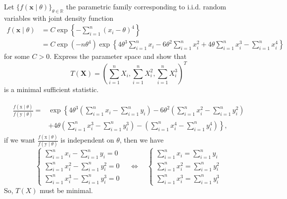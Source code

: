 \begin{exercise}
    Let \(\{f(\mathbf{x} \mid \theta)\}_{\theta \in \mathbb{R}}\) the parametric family corresponding to i.i.d. random variables with joint density function
    \[
        \begin{aligned}
            f(\mathbf{x} \mid \theta)&=C \exp \left\{-\sum_{i=1}^{n}\left(x_{i}-\theta\right)^{4}\right\}\\
            &=C \exp \left(-n \theta^{4}\right) \exp \left\{4 \theta^{3} \sum_{i=1}^{n} x_{i}-6 \theta^{2} \sum_{i=1}^{n} x_{i}^{2}+4 \theta \sum_{i=1}^{n} x_{i}^{3}-\sum_{i=1}^{n} x_{i}^{4}\right\}
        \end{aligned}
    \]
    for some \(C>0\). Express the parameter space and show that
    \[
        T(\mathbf{X})=\left(\sum_{i=1}^{n} X_{i}, \sum_{i=1}^{n} X_{i}^{2}, \sum_{i=1}^{n} X_{i}^{3}\right)^T
    \]
    is a minimal sufficient statistic. 
\end{exercise}

\begin{solution}
    \begin{align}
        \begin{aligned}
        \frac{f(\mathrm{x} \mid \theta)}{f(\mathrm{y} \mid \theta)}=& \exp \left\{4 \theta^{3}\left(\sum_{i=1}^{n} x_{i}-\sum_{i=1}^{n} y_{i}\right)-6 \theta^{2}\left(\sum_{i=1}^{n} x_{i}^{2}-\sum_{i=1}^{n} y_{i}^{2}\right)\right.\\
        &\left.+4 \theta\left(\sum_{i=1}^{n} x_{i}^{3}-\sum_{i=1}^{n} y_{i}^{3}\right)-\left(\sum_{i=1}^{n} x_{i}^{4}-\sum_{i=1}^{n} y_{i}^{4}\right)\right\}, 
        \end{aligned}
    \end{align}
    if we want $\frac{f(\mathrm{x} \mid \theta)}{f(\mathrm{y} \mid \theta)}$ is independent on $\theta$, then we have
    \[
        \left\{\begin{array} { l } 
            { \sum _ { i = 1 } ^ { n } x _ { i } - \sum _ { i = 1 } ^ { n } y _ { i } = 0 } \\
            { \sum _ { i = 1 } ^ { n } x _ { i } ^ { 2 } - \sum _ { i = 1 } ^ { n } y _ { i } ^ { 2 } = 0 } \\
            { \sum _ { i = 1 } ^ { n } x _ { i } ^ { 3 } - \sum _ { i = 1 } ^ { n } y _ { i } ^ { 3 } = 0 }
        \end{array}\right. \quad \Leftrightarrow \quad \left\{\begin{array}{l}
            \sum_{i=1}^{n} x_{i}=\sum_{i=1}^{n} y_{i} \\
            \sum_{i=1}^{n} x_{i}^{2}=\sum_{i=1}^{n} y_{i}^{2} \\
            \sum_{i=1}^{n} x_{i}^{3}=\sum_{i=1}^{n} y_{i}^{3}
        \end{array}\right.
    \]
    So, $T(X)$ must be minimal. 
\end{solution}

